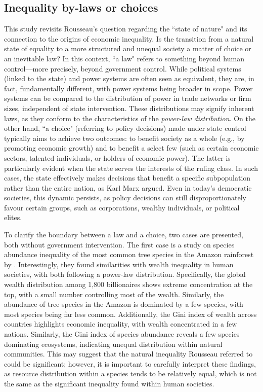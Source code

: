 \documentclass[12pt]{article}
\begin{document}
\subsection{Inequality by-laws or choices}
This study revisits Rousseau's question regarding the ``state of nature" and its connection to the origins of economic inequality. Is the transition from a natural state of equality to a more structured and unequal society a matter of choice or an inevitable law? In this context, ``a law" refers to something beyond human control—more precisely, beyond government control. While political systems (linked to the state) and power systems are often seen as equivalent, they are, in fact, fundamentally different, with power systems being broader in scope. Power systems can be compared to the distribution of power in trade networks or firm sizes, independent of state intervention. These distributions may signify inherent laws, as they conform to the characteristics of the \textit{power-law distribution}. On the other hand, ``a choice" (referring to policy decisions) made under state control typically aims to achieve two outcomes: to benefit society as a whole (e.g., by promoting economic growth) and to benefit a select few (such as certain economic sectors, talented individuals, or holders of economic power). The latter is particularly evident when the state serves the interests of the ruling class. In such cases, the state effectively makes decisions that benefit a specific subpopulation rather than the entire nation, as Karl Marx argued. Even in today's democratic societies, this dynamic persists, as policy decisions can still disproportionately favour certain groups, such as corporations, wealthy individuals, or political elites.

To clarify the boundary between a law and a choice, two cases are presented, both without government intervention. The first case is a study on species abundance inequality of the most common tree species in the Amazon rainforest by \textcite{scheffer2017inequality}. Interestingly, they found similarities with wealth inequality in human societies, with both following a power-law distribution. Specifically, the global wealth distribution among 1,800 billionaires shows extreme concentration at the top, with a small number controlling most of the wealth. Similarly, the abundance of tree species in the Amazon is dominated by a few species, with most species being far less common. Additionally, the Gini index of wealth across countries highlights economic inequality, with wealth concentrated in a few nations. Similarly, the Gini index of species abundance reveals a few species dominating ecosystems, indicating unequal distribution within natural communities. This may suggest that the natural inequality Rousseau referred to could be significant; however, it is important to carefully interpret these findings, as resource distribution within a species tends to be relatively equal, which is not the same as the significant inequality found within human societies. 
\end{document}
